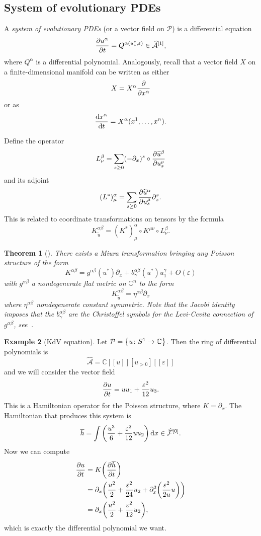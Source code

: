 \documentclass[leqno, openany]{memoir}
\newtheorem{thm}{Theorem}[section]
\theoremstyle{definition}
\newtheorem{exm}[thm]{Example}
\theoremstyle{remark}
\theoremstyle{plain}
\theoremstyle{definition}
\theoremstyle{remark}
\newcommand{\C}{\mathbb{C}}
\newcommand{\ep}{\varepsilon}
\newcommand{\mc}[1]{\mathcal{#1}}
\newcommand{\ol}[1]{\overline{#1}}
\newcommand{\wt}[1]{\widetilde{#1}}
\newcommand{\wh}[1]{\widehat{#1}}
\begin{document}
\subsection{System of evolutionary PDEs}

A \textit{system of evolutionary PDEs} (or a vector field on $\mc{P}$) is a differential equation
\[ \pdv{u^{\alpha}}{t} = Q^{\alpha(u_*^*, \ep)} \in \wh{\mc{A}}^{[1]}, \]
where $Q^{\alpha}$ is a differential polynomial. Analogously, recall that a vector field $X$ on a finite-dimensional manifold can be written as either
\[ X = X^{\alpha} \pdv{x^{\alpha}} \]
or as 
\[ \dv{x^{\alpha}}{t} = X^{\alpha}(x^1, \ldots, x^n). \]

Define the operator
\[ L_{\nu}^{\beta} = \sum_{s \geq 0} (-\partial_x)^s \circ \pdv{\wt{u}^{\beta}}{u_s^{\nu}} \]
and its adjoint
\[ (L^*)_{\mu}^{\alpha} = \sum_{s \geq 0} \pdv{\wt{u}^{\alpha}}{u_s^{\mu}} \partial_x^s. \]
This is related to coordinate transformations on tensors by the formula
\[ K_{\wt{u}}^{\alpha\beta} = (K^*)_{\mu}^{\alpha} \circ K^{\mu\nu} \circ L_{\nu}^{\beta}. \]

\begin{thm}[\cite{darbouxhamiltonian}]
    There exists a Miura transformation bringing any Poisson structure of the form
    \[ K^{\alpha\beta} = g^{\alpha\beta}(u^*) \partial_x + b_{\gamma}^{\alpha\beta}(u^*) u_1^{\gamma} + O(\ep) \]
    with $g^{\alpha\beta}$ a nondegenerate flat metric on $\C^n$ to the form
    \[ K_{\wt{u}}^{\alpha\beta} = \eta^{\alpha\beta} \partial_x \]
    where $\eta^{\alpha\beta}$ nondegenerate constant symmetric. Note that the Jacobi identity imposes that the $b_{\gamma}^{\alpha\beta}$ are the Christoffel symbols for the Levi-Cevita connection of $g^{\alpha\beta}$, see~\cite{dubnov}.
\end{thm}

\begin{exm}[KdV equation]\label{exm:kdv}
    Let $\mc{P} = \qty{u \colon S^1 \to \C}$. Then the ring of differential polynomials is
    \[ \wh{\mc{A}} = \C[[u]] [u_{>0}] [[\ep]] \]
    and we will consider the vector field
    \[ \pdv{u}{t} = u u_1 + \frac{\ep^2}{12} u_3. \]
    This is a Hamiltonian operator for the Poisson structure, where $K = \partial_x$. The Hamiltonian that produces this system is
    \[ \ol{h} = \int \qty(\frac{u^3}{6} + \frac{\ep^2}{12} u u_2) \dd{x} \in \wh{\mc{F}}^{[0]}. \]
    Now we can compute
    \begin{align*}
        \pdv{u}{t} &= K \qty(\pdv{\ol{h}}{t}) \\
        &= \partial_x \qty(\frac{u^2}{2} + \frac{\ep^2}{24} u_2 + \partial_x^2 \qty(\frac{\ep^2}{2u}u)) \\
        &= \partial_x \qty(\frac{u^2}{2} + \frac{\ep^2}{12} u_2),
    \end{align*}
    which is exactly the differential polynomial we want.
\end{exm}
\end{document}
